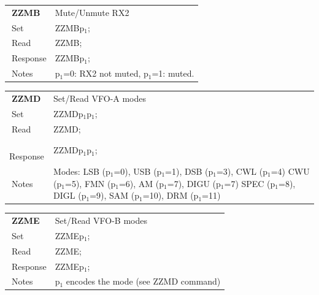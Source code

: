 \documentclass[12pt]{book}
\begin{document}
\begin{center}
\begin{tabular}{|p{2cm}|p{11cm}|}
\toprule
$\phantom{\Big|}$\textbf{\large ZZMB} & Mute/Unmute RX2 \\\cline{1-2}
$\phantom{\Big|}${\large Set} & {ZZMBp$_1$;} \\\hline
$\phantom{\Big|}${\large Read} & {ZZMB;} \\\hline
$\phantom{\Big|}${\large Response} & {ZZMBp$_1$;} \\\hline
$\phantom{\Big|}${\large Notes} & \multicolumn{1}{|p{11cm}|}{p$_1$=0: RX2 not muted, p$_1$=1: muted.} \\
\bottomrule
\end{tabular}
\end{center}

\begin{center}
\begin{tabular}{|p{2cm}|p{11cm}|}
\toprule
$\phantom{\Big|}$\textbf{\large ZZMD} & Set/Read VFO-A modes \\\cline{1-2}
$\phantom{\Big|}${\large Set} & {ZZMDp$_1$p$_1$;} \\\hline
$\phantom{\Big|}${\large Read} & {ZZMD;} \\\hline
$\phantom{\Big|}${\large Response} & {ZZMDp$_1$p$_1$;} \\\hline
$\phantom{\Big|}${\large Notes} & \multicolumn{1}{|p{11cm}|}{Modes: LSB (p$_1$=0), USB (p$_1$=1), DSB (p$_1$=3), CWL (p$_1$=4) CWU (p$_1$=5), FMN (p$_1$=6), AM (p$_1$=7), DIGU (p$_1$=7) SPEC (p$_1$=8), DIGL (p$_1$=9), SAM (p$_1$=10), DRM (p$_1$=11)} \\
\bottomrule
\end{tabular}
\end{center}

\begin{center}
\begin{tabular}{|p{2cm}|p{11cm}|}
\toprule
$\phantom{\Big|}$\textbf{\large ZZME} & Set/Read VFO-B modes \\\cline{1-2}
$\phantom{\Big|}${\large Set} & {ZZMEp$_1$;} \\\hline
$\phantom{\Big|}${\large Read} & {ZZME;} \\\hline
$\phantom{\Big|}${\large Response} & {ZZMEp$_1$;} \\\hline
$\phantom{\Big|}${\large Notes} & \multicolumn{1}{|p{11cm}|}{p$_1$ encodes the mode (see ZZMD command)} \\
\bottomrule
\end{tabular}
\end{center}
\end{document}
